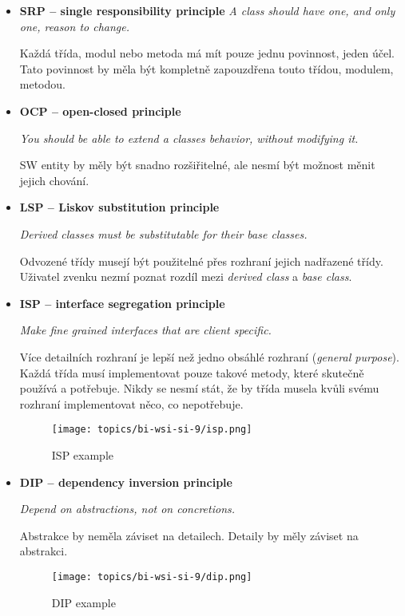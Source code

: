 \documentclass{szzclass}
\begin{document}
\begin{itemize}
      \item \textbf{SRP -- single responsibility principle}
      \textit{A class should have one, and only one, reason to change.}

      Každá třída, modul nebo metoda má mít pouze jednu povinnost, jeden účel.
      Tato povinnost by měla být kompletně zapouzdřena touto třídou, modulem, metodou.

      \item \textbf{OCP -- open-closed principle}

      \textit{You should be able to extend a classes behavior, without modifying it.}

      SW entity by měly být snadno rozšiřitelné, ale nesmí být možnost měnit jejich chování.

      \item \textbf{LSP -- Liskov substitution principle}

      \textit{Derived classes must be substitutable for their base classes.}

      Odvozené třídy musejí být použitelné přes rozhraní jejich nadřazené třídy.
      Uživatel zvenku nezmí poznat rozdíl mezi \textit{derived class} a \textit{base class}.

      \item \textbf{ISP -- interface segregation principle}

      \textit{Make fine grained interfaces that are client specific.}

      Více detailních rozhraní je lepší než jedno obsáhlé rozhraní (\textit{general purpose}).
      Každá třída musí implementovat pouze takové metody, které skutečně používá a potřebuje.
      Nikdy se nesmí stát, že by třída musela kvůli svému rozhraní implementovat něco, co nepotřebuje.
      \begin{figure}[ht]
            \centering
            \texttt{[image: topics/bi-wsi-si-9/isp.png]}
            \caption{ISP example}
      \end{figure}

      \item \textbf{DIP -- dependency inversion principle}

      \textit{Depend on abstractions, not on concretions.}

      Abstrakce by neměla záviset na detailech. Detaily by měly záviset na abstrakci.
      \begin{figure}[ht]
            \centering
            \texttt{[image: topics/bi-wsi-si-9/dip.png]}
            \caption{DIP example}
      \end{figure}


\end{itemize}
\end{document}
